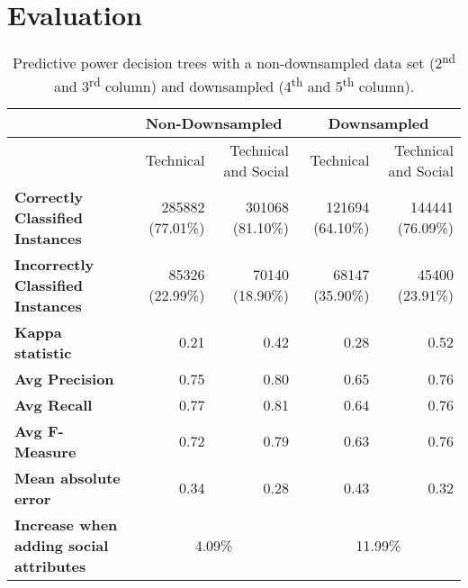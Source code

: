 \documentclass[10pt, conference]{IEEEtran}
\begin{document}
\section{Evaluation} \label{eval}
\begin{table*}[ht]
\centering
\begin{tabular}{l||r|r||r|r}
  & \multicolumn{2}{|c||}{Non-Downsampled}  & \multicolumn{2}{|c}{Downsampled} \\
\hline
  & Technical & Technical and Social & Technical & Technical and Social \\
\hline
	\textbf{Correctly Classified Instances}&  285882 (77.01\%) & 301068
	(81.10\%)  & 121694 (64.10\%) & 144441 (76.09\%)\\

	\textbf{Incorrectly Classified Instances}&  85326 (22.99\%) & 70140
	(18.90\%) & 68147 (35.90\%) &  45400 (23.91\%)\\

\textbf{Kappa statistic}& 0.21 &  0.42 & 0.28  & 0.52 \\
\textbf{Avg Precision}& 0.75 & 0.80  & 0.65  & 0.76 \\
\textbf{Avg Recall}& 0.77 & 0.81 & 0.64 & 0.76 \\
\textbf{Avg F-Measure}& 0.72 & 0.79  & 0.63  & 0.76 \\



\textbf{Mean absolute error}& 0.34 &  0.28 & 0.43 & 0.32\\

\hline
\textbf{Increase when adding social attributes}& \multicolumn{2}{|c||}{4.09\%}  & \multicolumn{2}{|c}{11.99\%}\\

\hline
\end{tabular}
\\
\center
	\caption{\label{resultsTable} Predictive power 
      decision trees with a non-downsampled data set
	(2\textsuperscript{nd} and 3\textsuperscript{rd} column) and downsampled
	(4\textsuperscript{th} and 5\textsuperscript{th} column). 
	}   
\end{table*}
\end{document}

